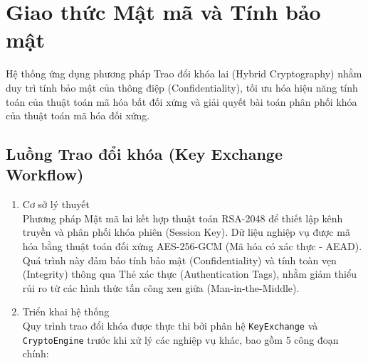 \section{Giao thức Mật mã và Tính bảo mật}

Hệ thống ứng dụng phương pháp Trao đổi khóa lai (Hybrid Cryptography) nhằm duy trì tính bảo mật của thông điệp (Confidentiality), tối ưu hóa hiệu năng tính toán của thuật toán mã hóa bất đối xứng và giải quyết bài toán phân phối khóa của thuật toán mã hóa đối xứng.

\subsection[Luồng Trao đổi khóa]{Luồng Trao đổi khóa (Key Exchange Workflow)}

\begin{enumerate}
    \item Cơ sở lý thuyết \\
    Phương pháp Mật mã lai kết hợp thuật toán RSA-2048 để thiết lập kênh truyền và phân phối khóa phiên (Session Key). Dữ liệu nghiệp vụ được mã hóa bằng thuật toán đối xứng AES-256-GCM (Mã hóa có xác thực - AEAD). Quá trình này đảm bảo tính bảo mật (Confidentiality) và tính toàn vẹn (Integrity) thông qua Thẻ xác thực (Authentication Tags), nhằm giảm thiểu rủi ro từ các hình thức tấn công xen giữa (Man-in-the-Middle).

    \item Triển khai hệ thống \\
    Quy trình trao đổi khóa được thực thi bởi phân hệ \texttt{KeyExchange} và \texttt{CryptoEngine} trước khi xử lý các nghiệp vụ khác, bao gồm 5 công đoạn chính:
    

\end{enumerate}
